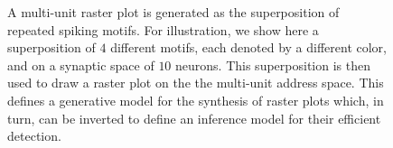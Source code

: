 \documentclass[11pt]{article}
\begin{document}
\begin{figure}[h!]%
%
{}%
%
{}
{
\caption{A multi-unit raster plot is generated as the superposition of repeated spiking motifs. For illustration, we show here a superposition of $4$ different motifs, each denoted by a different color, and on a synaptic space of $10$ neurons. This superposition is then used to draw a raster plot on the the multi-unit address space. This defines a generative model for the synthesis of raster plots which, in turn, can be inverted to define an inference model for their efficient detection.
}
\label{fig:1}
}
\vspace{-5pt}
\end{figure}%
%
%
\end{document}
